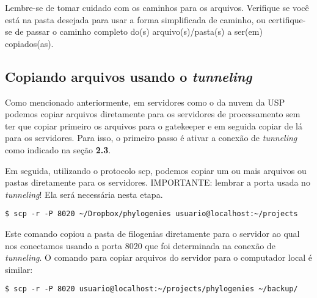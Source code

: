 \documentclass[]{article}
\begin{document}
Lembre-se de tomar cuidado com os caminhos para os arquivos. Verifique
se você está na pasta desejada para usar a forma simplificada de
caminho, ou certifique-se de passar o caminho completo do(s)
arquivo(s)/pasta(s) a ser(em) copiados(as).

\subsection{\texorpdfstring{Copiando arquivos usando o
\emph{tunneling}}{Copiando arquivos usando o tunneling}}\label{copiando-arquivos-usando-o-tunneling}

Como mencionado anteriormente, em servidores como o da nuvem da USP
podemos copiar arquivos diretamente para os servidores de processamento
sem ter que copiar primeiro os arquivos para o gatekeeper e em seguida
copiar de lá para os servidores. Para isso, o primeiro passo é ativar a
conexão de \emph{tunneling} como indicado na seção \textbf{2.3}.

Em seguida, utilizando o protocolo scp, podemos copiar um ou mais
arquivos ou pastas diretamente para os servidores. IMPORTANTE: lembrar a
porta usada no \emph{tunneling}! Ela será necessária nesta etapa.

\begin{verbatim}
$ scp -r -P 8020 ~/Dropbox/phylogenies usuario@localhost:~/projects
\end{verbatim}

Este comando copiou a pasta de filogenias diretamente para o servidor ao
qual nos conectamos usando a porta 8020 que foi determinada na conexão
de \emph{tunneling}. O comando para copiar arquivos do servidor para o
computador local é similar:

\begin{verbatim}
$ scp -r -P 8020 usuario@localhost:~/projects/phylogenies ~/backup/
\end{verbatim}
\end{document}
